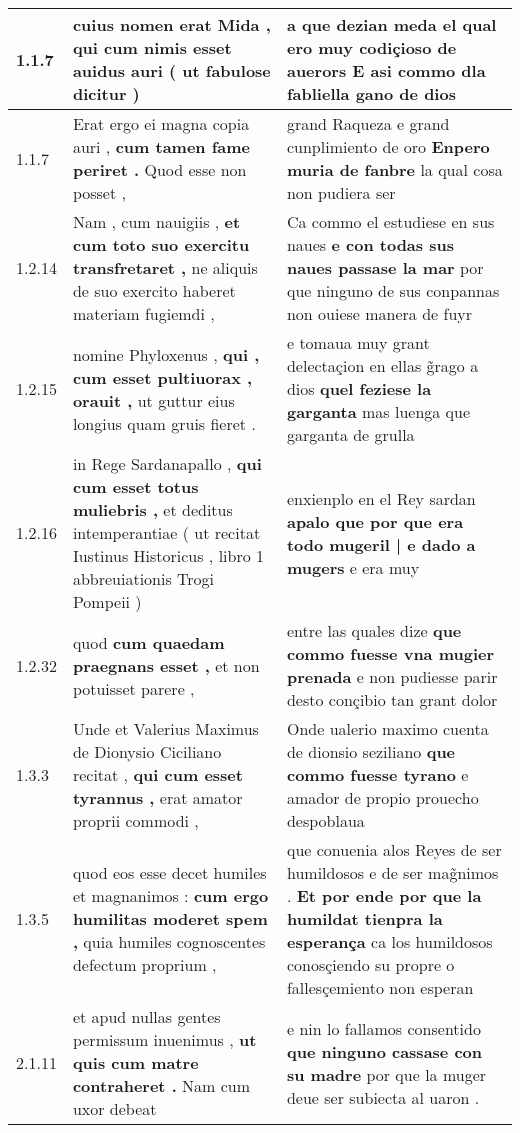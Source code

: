 \begin{tabular}{|p{1cm}|p{6.5cm}|p{6.5cm}|}

\hline
1.1.7 & cuius nomen erat Mida , \textbf{ qui cum nimis esset auidus auri } ( ut fabulose dicitur ) & a que dezian meda \textbf{ el qual ero muy codiçioso de auerors } E asi commo dla fabliella gano de dios \\\hline
1.1.7 & Erat ergo ei magna copia auri , \textbf{ cum tamen fame periret . } Quod esse non posset , & grand Raqueza e grand cunplimiento de oro \textbf{ Enpero muria de fanbre } la qual cosa non pudiera ser \\\hline
1.2.14 & Nam , cum nauigiis , \textbf{ et cum toto suo exercitu transfretaret , } ne aliquis de suo exercito haberet materiam fugiemdi , & Ca commo el estudiese en sus naues \textbf{ e con todas sus naues passase la mar } por que ninguno de sus conpannas non ouiese manera de fuyr \\\hline
1.2.15 & nomine Phyloxenus , \textbf{ qui , cum esset pultiuorax , orauit , } ut guttur eius longius quam gruis fieret . & e tomaua muy grant delectaçion en ellas g̃rago a dios \textbf{ quel feziese la garganta } mas luenga que garganta de grulla \\\hline
1.2.16 & in Rege Sardanapallo , \textbf{ qui cum esset totus muliebris , } et deditus intemperantiae ( ut recitat Iustinus Historicus , libro 1 abbreuiationis Trogi Pompeii ) & enxienplo en el Rey sardan \textbf{ apalo que por que era todo mugeril | e dado a mugers } e era muy \\\hline
1.2.32 & quod \textbf{ cum quaedam praegnans esset , } et non potuisset parere , & entre las quales dize \textbf{ que commo fuesse vna mugier prenada } e non pudiesse parir desto conçibio tan grant dolor \\\hline
1.3.3 & Unde et Valerius Maximus de Dionysio Ciciliano recitat , \textbf{ qui cum esset tyrannus , } erat amator proprii commodi , & Onde ualerio maximo cuenta de dionsio seziliano \textbf{ que commo fuesse tyrano } e amador de propio prouecho despoblaua \\\hline
1.3.5 & quod eos esse decet humiles et magnanimos : \textbf{ cum ergo humilitas moderet spem , } quia humiles cognoscentes defectum proprium , & que conuenia alos Reyes de ser humildosos e de ser mag̃nimos . \textbf{ Et por ende por que la humildat tienpra la esperança } ca los humildosos conosçiendo su propre o fallesçemiento non esperan \\\hline
2.1.11 & et apud nullas gentes permissum inuenimus , \textbf{ ut quis cum matre contraheret . } Nam cum uxor debeat & e nin lo fallamos consentido \textbf{ que ninguno cassase con su madre } por que la muger deue ser subiecta al uaron . \\\hline

\end{tabular}
